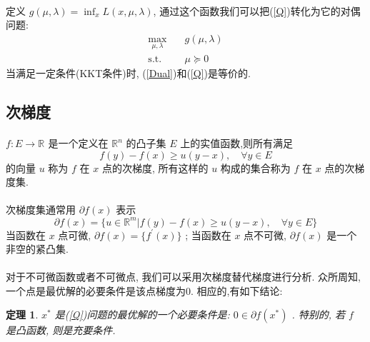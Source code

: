 \documentclass[a4paper, UTF8]{ctexart}				%
\newtheorem{theo}{\bf 定理}[section]			  %
\numberwithin{equation}{section}				%
\begin{document}
			\paragraph{}
				\quad 定义 $g(\mu, \lambda) = \inf_x L(x, \mu, \lambda)$, 通过这个函数我们可以把(\ref{Q})转化为它的对偶问题:
				\begin{equation}
					\begin{split}\label{Dual}
						\max_{\mu, \lambda} \quad
							& g(\mu,\lambda)\\
						\text{s.t.} \quad
							& \mu \succeq 0
					\end{split}
				\end{equation}
				当满足一定条件(KKT条件)时, (\ref{Dual})和(\ref{Q})是等价的.

		\subsection{次梯度}
			\paragraph{}
				\quad $f: E \rightarrow \mathbb{R}^{}$ 是一个定义在 $\mathbb{R}^{n}$ 的凸子集 $E$ 上的实值函数,则所有满足
				\begin{equation}
					f(y) - f(x) \geq u(y-x), \quad \forall y \in E
				\end{equation}
				的向量 $u$ 称为 $f$ 在 $x$ 点的次梯度, 所有这样的 $u$ 构成的集合称为 $f$ 在 $x$ 点的次梯度集.

			\paragraph{}
				\quad 次梯度集通常用 $\partial f(x)$ 表示
				\begin{equation}
						\partial f(x)
					=	\{u \in \mathbb{R}^{m} \vert f(y) - f(x) \geq u(y - x), \quad \forall y \in E\}
				\end{equation}
				当函数在 $x$ 点可微, $\partial f(x) = \{f^\prime(x)\}$ ; 当函数在 $x$ 点不可微, $\partial f(x)$ 是一个非空的紧凸集.

			\paragraph{}
				\quad 对于不可微函数或者不可微点, 我们可以采用次梯度替代梯度进行分析. 众所周知, 一个点是最优解的必要条件是该点梯度为0. 相应的,有如下结论:
			\begin{theo}
				$x^*$ 是(\ref{Q})问题的最优解的一个必要条件是: $0 \in \partial f(x^*)$ . 特别的, 若 $f$ 是凸函数, 则是充要条件.
			\end{theo}
\end{document}

